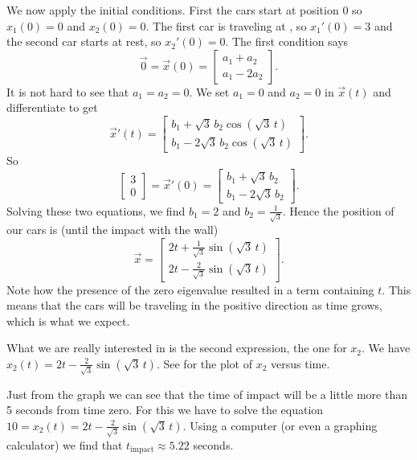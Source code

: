 \begin{example}
We now apply the initial conditions.  First the cars start at position 0
so $x_1 (0) = 0$ and $x_2(0) = 0$.  The first car is traveling at
,
so $x_1'(0) = 3$ and the second car starts at rest, so $x_2'(0) = 0$.
The first condition says
\begin{equation*}
\vec{0} = \vec{x}(0) = 
\begin{bmatrix}
a_1 + a_2 \\
a_1 - 2 a_2 
\end{bmatrix} .
\end{equation*}
It is not hard to see that $a_1 = a_2 = 0$.  We set $a_1=0$
and $a_2=0$ in $\vec{x}(t)$
and differentiate to get
\begin{equation*}
{\vec{x}}'(t)
=
\begin{bmatrix}
b_1 + \sqrt{3} \, b_2 \cos ( \sqrt{3} \, t ) \\
b_1 - 2 \sqrt{3} \, b_2 \cos ( \sqrt{3} \, t )
\end{bmatrix} .
\end{equation*}
So
\begin{equation*}
\begin{bmatrix} 3 \\ 0 \end{bmatrix} = 
{\vec{x}}'(0)
=
\begin{bmatrix}
b_1 + \sqrt{3} \, b_2 \\
b_1 - 2 \sqrt{3} \, b_2 
\end{bmatrix} .
\end{equation*}
Solving these two equations, we
find $b_1 = 2$ and $b_2 =
\frac{1}{\sqrt{3}}$.  Hence the position of our cars is
(until the impact with the wall)
\begin{equation*}
\vec{x} = 
\begin{bmatrix}
2 t + \frac{1}{\sqrt{3}} \sin ( \sqrt{3} \, t ) \\
2 t - \frac{2}{\sqrt{3}} \sin ( \sqrt{3} \, t )
\end{bmatrix} .
\end{equation*}
Note how the presence of the zero eigenvalue resulted in a term containing $t$.
This means that the cars will be traveling in the positive direction as
time grows, which is what we expect.


What we are really interested in is the second expression, the one for $x_2$.
We have $x_2(t) = 
2 t - \frac{2}{\sqrt{3}} \sin ( \sqrt{3} \, t)$.  See 
for the plot of $x_2$ versus time.

Just from the graph we can see that the time of impact will be a little
more than 5 seconds from time zero.  For this we have to solve
the equation $10 = x_2(t) = 2 t - \frac{2}{\sqrt{3}} \sin ( \sqrt{3} \,
t)$.
Using a computer (or even a graphing calculator)
we find that $t_{\text{impact}} \approx 5.22$ seconds.


\end{example}
